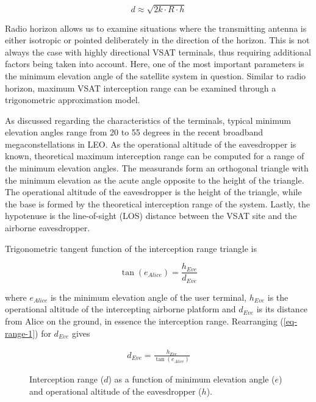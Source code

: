 \documentclass[english, 12pt, a4paper, elec, utf8, a-1b, online]{aaltothesis}
\begin{document}
\begin{equation} \label{eq-radio-horizon-ath}
  d \approx \sqrt{2 k \cdot R \cdot h}
\end{equation}

Radio horizon allows us to examine situations where the transmitting antenna is either isotropic or pointed deliberately in the direction of the horizon.
This is not always the case with highly directional VSAT terminals, thus requiring additional factors being taken into account.
Here, one of the most important parameters is the minimum elevation angle of the satellite system in question.
Similar to radio horizon, maximum VSAT interception range can be examined through a trigonometric approximation model.

As discussed regarding the characteristics of the terminals, typical minimum elevation angles range from 20 to 55 degrees in the recent broadband megaconstellations in LEO.
As the operational altitude of the eavesdropper is known, theoretical maximum interception range can be computed for a range of the minimum elevation angles.
The measurands form an orthogonal triangle with the minimum elevation as the acute angle opposite to the height of the triangle.
The operational altitude of the eavesdropper is the height of the triangle, while the base is formed by the theoretical interception range of the system.
Lastly, the hypotenuse is the line-of-sight (LOS) distance between the VSAT site and the airborne eavesdropper.

Trigonometric tangent function of the interception range triangle is

\begin{equation} \label{eq-range-1}
  \tan(e_{Alice}) = \frac{h_{Eve}}{d_{Eve}}
\end{equation}

\noindent
where $e_{Alice}$ is the minimum elevation angle of the user terminal, $h_{Eve}$ is the operational altitude of the intercepting airborne platform and $d_{Eve}$ is its distance from Alice on the ground, in essence the interception range.
Rearranging (\ref{eq-range-1}) for $d_{Eve}$ gives

\begin{align} \label{eq-range-2}
  d_{Eve} = \frac{h_{Eve}}{\tan(e_{Alice})}
\end{align}

\begin{figure}[h]
  \centering
  
  \caption{Interception range ($d$) as a function of minimum elevation angle ($e$) and operational altitude of the eavesdropper ($h$).}
  \label{fig-interception-range}
\end{figure}
\end{document}

